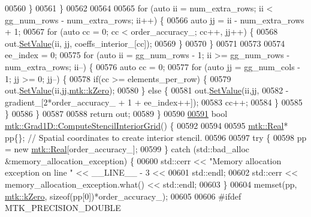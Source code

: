 \begin{DoxyCode}
{{00560     \}
00561   \}
00562 
00564 
00565   \textcolor{keywordflow}{for} (\textcolor{keyword}{auto} ii = num\_extra\_rows; ii < gg\_num\_rows - num\_extra\_rows; ii++) \{
00566     \textcolor{keyword}{auto} jj = ii - num\_extra\_rows + 1;
00567     \textcolor{keywordflow}{for} (\textcolor{keyword}{auto} cc = 0; cc < order\_accuracy\_; cc++, jj++) \{
00568       out.\hyperlink{classmtk_1_1DenseMatrix_a784ce5784109ac86bfb9d8562b334b13}{SetValue}(ii, jj, coeffs\_interior\_[cc]);
00569     \}
00570   \}
00571 
00573 
00574   ee\_index = 0;
00575   \textcolor{keywordflow}{for} (\textcolor{keyword}{auto} ii = gg\_num\_rows - 1; ii >= gg\_num\_rows - num\_extra\_rows; ii--) \{
00576     \textcolor{keyword}{auto} cc = 0;
00577     \textcolor{keywordflow}{for} (\textcolor{keyword}{auto} jj = gg\_num\_cols - 1; jj >= 0; jj--) \{
00578       \textcolor{keywordflow}{if}(cc >= elements\_per\_row) \{
00579         out.\hyperlink{classmtk_1_1DenseMatrix_a784ce5784109ac86bfb9d8562b334b13}{SetValue}(ii,jj,\hyperlink{group__c01-roots_ga59a451a5fae30d59649bcda274fea271}{mtk::kZero});
00580       \} \textcolor{keywordflow}{else} \{
00581         out.\hyperlink{classmtk_1_1DenseMatrix_a784ce5784109ac86bfb9d8562b334b13}{SetValue}(ii,jj,
00582                      -gradient\_[2*order\_accuracy\_ + 1 + ee\_index++]);
00583         cc++;
00584       \}
00585      \}
00586   \}
00587 
00588   \textcolor{keywordflow}{return} out;
00589 \}
00590 
\hypertarget{mtk__grad__1d_8cc_source_l00591}{}\hyperlink{classmtk_1_1Grad1D_ad6df25cc9dfc85ff8562ae3605486976}{00591} \textcolor{keywordtype}{bool} \hyperlink{classmtk_1_1Grad1D_ad6df25cc9dfc85ff8562ae3605486976}{mtk::Grad1D::ComputeStencilInteriorGrid}() \{
00592 
00594 
00595   \hyperlink{group__c01-roots_gac080bbbf5cbb5502c9f00405f894857d}{mtk::Real}* pp\{\}; \textcolor{comment}{// Spatial coordinates to create interior stencil.}
00596 
00597   \textcolor{keywordflow}{try} \{
00598     pp = \textcolor{keyword}{new} \hyperlink{group__c01-roots_gac080bbbf5cbb5502c9f00405f894857d}{mtk::Real}[order\_accuracy\_];
00599   \} \textcolor{keywordflow}{catch} (std::bad\_alloc &memory\_allocation\_exception) \{
00600     std::cerr << \textcolor{stringliteral}{"Memory allocation exception on line "} << \_\_LINE\_\_ - 3 <<
00601       std::endl;
00602     std::cerr << memory\_allocation\_exception.what() << std::endl;
00603   \}
00604   memset(pp, \hyperlink{group__c01-roots_ga59a451a5fae30d59649bcda274fea271}{mtk::kZero}, \textcolor{keyword}{sizeof}(pp[0])*order\_accuracy\_);
00605 
00606 \textcolor{preprocessor}{  #ifdef MTK\_PRECISION\_DOUBLE}
}}
\end{DoxyCode}
